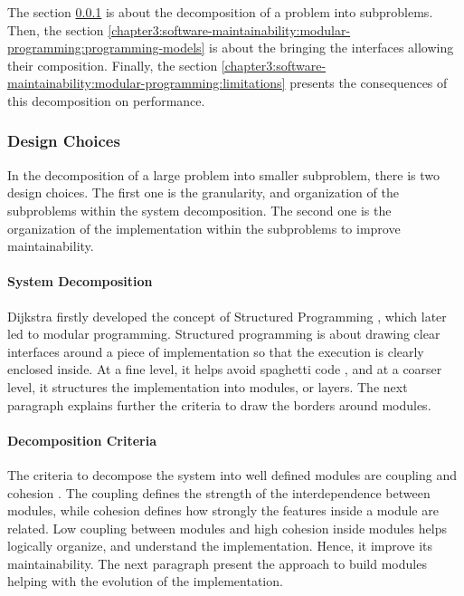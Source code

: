 The section \ref{chapter3:software-maintainability:modular-programming:design-choices} is about the decomposition of a problem into subproblems.
Then, the section \ref{chapter3:software-maintainability:modular-programming:programming-models} is about the bringing the interfaces allowing their composition.
Finally, the section \ref{chapter3:software-maintainability:modular-programming:limitations} presents the consequences of this decomposition on performance.


\subsubsection{Design Choices} \label{chapter3:software-maintainability:modular-programming:design-choices}

In the decomposition of a large problem into smaller subproblem, there is two design choices.
The first one is the granularity, and organization of the subproblems within the system decomposition.
The second one is the organization of the implementation within the subproblems to improve maintainability.

\paragraph{System Decomposition}


Dijkstra firstly developed the concept of Structured Programming \cite{Dijkstra1970}, which later led to modular programming.
Structured programming is about drawing clear interfaces around a piece of implementation so that the execution is clearly enclosed inside.
At a fine level, it helps avoid spaghetti code \cite{Dijkstra1968a}, and at a coarser level, it structures the implementation \cite{Dijkstra1968} into modules, or layers.
The next paragraph explains further the criteria to draw the borders around modules.


\paragraph{Decomposition Criteria}

The criteria to decompose the system into well defined modules are coupling and cohesion \cite{Stevens1974}.
The coupling defines the strength of the interdependence between modules, while cohesion defines how strongly the features inside a module are related.
Low coupling between modules and high cohesion inside modules helps logically organize, and understand the implementation.
Hence, it improve its maintainability.
The next paragraph present the approach to build modules helping with the evolution of the implementation.

